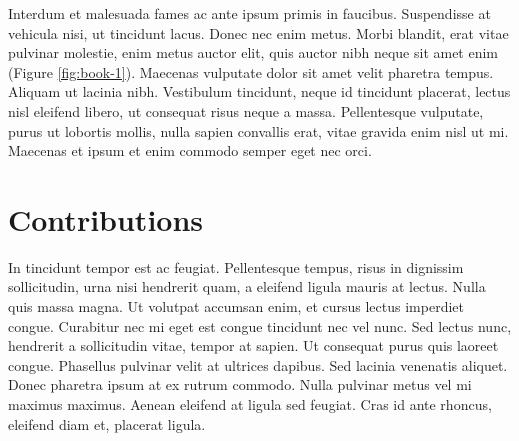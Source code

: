 Interdum et malesuada fames ac ante ipsum primis in faucibus. Suspendisse at vehicula nisi, ut tincidunt lacus. Donec nec enim metus. Morbi blandit, erat vitae pulvinar molestie, enim metus auctor elit, quis auctor nibh neque sit amet enim (Figure \ref{fig:book-1}). Maecenas vulputate dolor sit amet velit pharetra tempus. Aliquam ut lacinia nibh. Vestibulum tincidunt, neque id tincidunt placerat, lectus nisl eleifend libero, ut consequat risus neque a massa. Pellentesque vulputate, purus ut lobortis mollis, nulla sapien convallis erat, vitae gravida enim nisl ut mi. Maecenas et ipsum et enim commodo semper eget nec orci.

\section{Contributions}

In tincidunt tempor est ac feugiat. Pellentesque tempus, risus in dignissim sollicitudin, urna nisi hendrerit quam, a eleifend ligula mauris at lectus. Nulla quis massa magna. Ut volutpat accumsan enim, et cursus lectus imperdiet congue. Curabitur nec mi eget est congue tincidunt nec vel nunc. Sed lectus nunc, hendrerit a sollicitudin vitae, tempor at sapien. Ut consequat purus quis laoreet congue. Phasellus pulvinar velit at ultrices dapibus. Sed lacinia venenatis aliquet. Donec pharetra ipsum at ex rutrum commodo. Nulla pulvinar metus vel mi maximus maximus. Aenean eleifend at ligula sed feugiat. Cras id ante rhoncus, eleifend diam et, placerat ligula.

